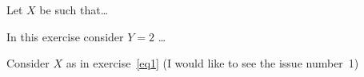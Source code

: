 \documentclass[a4paper,12pt]{article}
\begin{document}
\begin{exercise}\label{eq1}
  Let $X$ be such that\dots
\end{exercise}

\begin{exercise}
  In this exercise consider $Y=2$ \dots
\end{exercise}

\begin{exercise}
  Consider $X$ as in exercise~\ref{eq1} (I would like to see the issue
  number~1)
\end{exercise}
\end{document}
